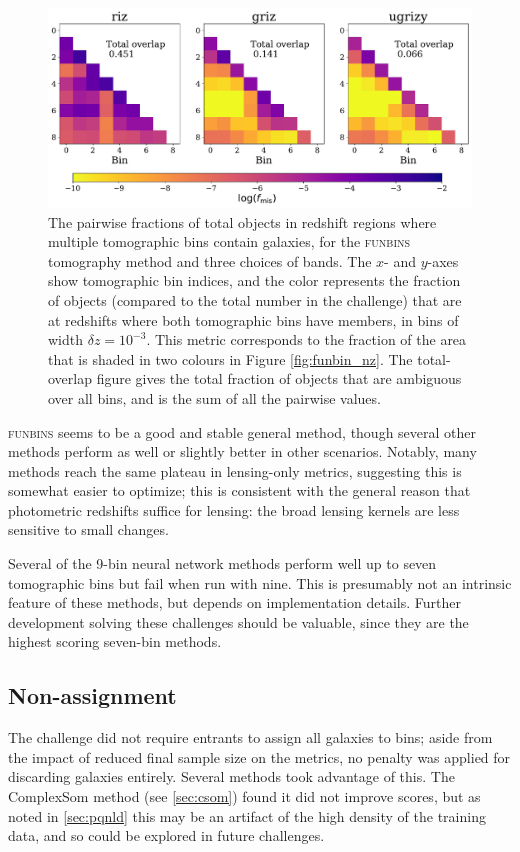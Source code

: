 \documentclass[twocolumn,twocolappendix]{aastex63}
\begin{document}
\begin{figure}[htbp]
\includegraphics[width=0.9\linewidth]{results/nzoverlap_dc2_funbins.pdf}
\caption{The pairwise fractions of total objects in redshift regions where multiple tomographic bins contain galaxies, for 
the \textsc{funbins} tomography method and three choices of bands.  
The $x$- and $y$-axes 
show tomographic bin indices, 
and the color represents the fraction of objects (compared to the total number in the challenge) that are 
at redshifts where both tomographic bins have members, in bins of width $\delta z=10^{-3}$.  
This metric corresponds to
the fraction of the area that is shaded in two colours in Figure \ref{fig:funbin_nz}.
The total-overlap figure gives the total fraction of objects
that are ambiguous over all bins, and is the sum of all the pairwise values.}
\label{fig:overlap}
\end{figure}



\textsc{funbins} seems to be a good and stable general method, though several other methods perform as well
or slightly better in other scenarios.  Notably, many methods reach the same plateau in lensing-only metrics,
suggesting this is somewhat easier to optimize; this is consistent with the general reason that photometric
redshifts suffice for lensing: the broad lensing kernels are less sensitive to small changes.

Several of the 9-bin neural network methods perform well up to seven tomographic bins but fail when run with 
nine.  This is presumably not an intrinsic feature of these methods, but depends on implementation details.
Further development solving these challenges should be valuable, since they are the highest scoring seven-bin
methods.

\subsection{Non-assignment}
The challenge did not require entrants to assign all galaxies to bins; aside from the impact of reduced final sample size on the metrics, no penalty was applied for discarding galaxies entirely.  Several methods
took advantage of this.  The ComplexSom method (see \autoref{sec:csom}) found
it did not improve scores, but as noted in \autoref{sec:pqnld} this may be an artifact
of the high density of the training data, and so could be explored in future challenges.
\end{document}
